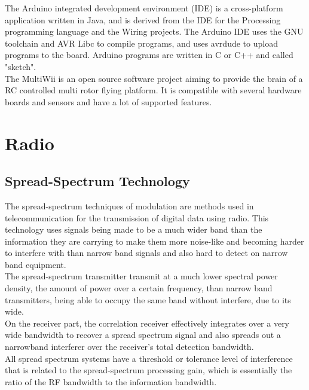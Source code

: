 \documentclass[12pt, a4paper,twoside]{tesi_upf}
\begin{document}
The Arduino integrated development environment (IDE) is a cross-platform application written in Java, and is derived from the IDE for the Processing programming language and the Wiring projects. The Arduino IDE uses the GNU toolchain and AVR Libc to compile programs, and uses avrdude to upload programs to the board. Arduino programs are written in C or C++ and called "sketch". 
\\[12pt]

The MultiWii is an open source software project aiming to provide the brain of a RC controlled multi rotor flying platform. It is compatible with several hardware boards and sensors and have a lot of supported features.
\\[12pt]

\chapter{Radio}

\section{Spread-Spectrum Technology}

The spread-spectrum techniques of modulation are methods used in telecommunication for the transmission of digital data using radio. This technology uses signals being made to be a much wider band than the information they are carrying to make them more noise-like and becoming harder to interfere with than narrow band signals and also hard to detect on narrow band equipment.
\\[12pt]


The spread-spectrum transmitter transmit at a much lower spectral power density, the amount of power over a certain frequency, than narrow band transmitters, being able to occupy the same band without interfere, due to its wide.
\\[12pt]

On the receiver part, the correlation receiver effectively integrates over a very wide bandwidth to recover a spread spectrum signal and also spreads out a narrowband interferer over the receiver's total detection bandwidth.
\\[12pt]

All spread spectrum systems have a threshold or tolerance level of interference that is related to the spread-spectrum processing gain, which is essentially the ratio of the RF bandwidth to the information bandwidth.
\\[12pt]
\end{document}
